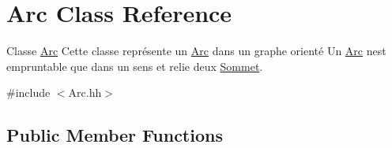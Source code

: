 \hypertarget{classArc}{}\section{Arc Class Reference}
\label{classArc}


Classe \hyperlink{classArc}{Arc} Cette classe repr\'{e}sente un \hyperlink{classArc}{Arc} dans un graphe orient\'{e} Un \hyperlink{classArc}{Arc} n\textquotesingle{}est empruntable que dans un sens et relie deux \hyperlink{classSommet}{Sommet}.  




{\ttfamily \#include $<$Arc.\+hh$>$}

\subsection*{Public Member Functions}
